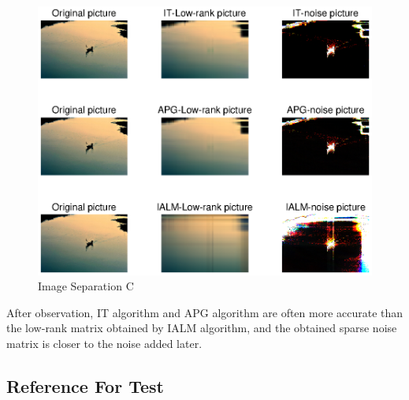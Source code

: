 \documentclass[UTF8]{report}
\begin{document}
\begin{figure}
\centering
\includegraphics{Image Separation C.eps}
\caption{Image Separation C}
\label{6}
\end{figure} 

After observation, IT algorithm and APG algorithm are often more accurate than the low-rank matrix obtained by IALM algorithm, and the obtained sparse noise matrix is closer to the noise added later.
\begin{appendix}
    \renewcommand{\thechapter}{\Alph{chapter}.}
    \chapter{Reference For Test}
    
    
    
    
    
    
    
\end{appendix}


\end{document}
